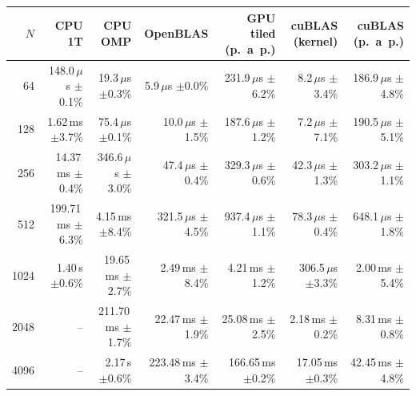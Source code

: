 \begin{tabular}{rrrrrrr}
\hline
$N$ & CPU 1T & CPU OMP & OpenBLAS & GPU tiled (p.~a~p.) & cuBLAS (kernel) & cuBLAS (p.~a~p.) \\ \hline
64 & 148.0\,$\mu$s $\pm$0.1\% & 19.3\,$\mu$s $\pm$0.3\% & 5.9\,$\mu$s $\pm$0.0\% & 231.9\,$\mu$s $\pm$6.2\% & 8.2\,$\mu$s $\pm$3.4\% & 186.9\,$\mu$s $\pm$4.8\% \\
128 & 1.62\,ms $\pm$3.7\% & 75.4\,$\mu$s $\pm$0.1\% & 10.0\,$\mu$s $\pm$1.5\% & 187.6\,$\mu$s $\pm$1.2\% & 7.2\,$\mu$s $\pm$7.1\% & 190.5\,$\mu$s $\pm$5.1\% \\
256 & 14.37\,ms $\pm$0.4\% & 346.6\,$\mu$s $\pm$3.0\% & 47.4\,$\mu$s $\pm$0.4\% & 329.3\,$\mu$s $\pm$0.6\% & 42.3\,$\mu$s $\pm$1.3\% & 303.2\,$\mu$s $\pm$1.1\% \\
512 & 199.71\,ms $\pm$6.3\% & 4.15\,ms $\pm$8.4\% & 321.5\,$\mu$s $\pm$4.5\% & 937.4\,$\mu$s $\pm$1.1\% & 78.3\,$\mu$s $\pm$0.4\% & 648.1\,$\mu$s $\pm$1.8\% \\
1024 & 1.40\,s $\pm$0.6\% & 19.65\,ms $\pm$2.7\% & 2.49\,ms $\pm$8.4\% & 4.21\,ms $\pm$1.2\% & 306.5\,$\mu$s $\pm$3.3\% & 2.00\,ms $\pm$5.4\% \\
2048 & -- & 211.70\,ms $\pm$1.7\% & 22.47\,ms $\pm$1.9\% & 25.08\,ms $\pm$2.5\% & 2.18\,ms $\pm$0.2\% & 8.31\,ms $\pm$0.8\% \\
4096 & -- & 2.17\,s $\pm$0.6\% & 223.48\,ms $\pm$3.4\% & 166.65\,ms $\pm$0.2\% & 17.05\,ms $\pm$0.3\% & 42.45\,ms $\pm$4.8\% \\
\hline
\end{tabular}
